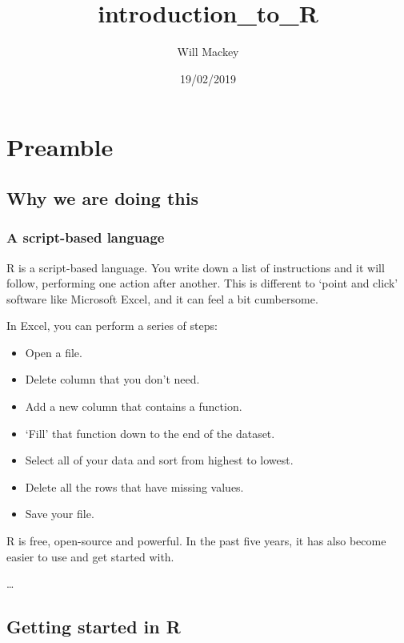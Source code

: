 \documentclass[]{tufte-handout}
\title{introduction\_to\_R}
\author{Will Mackey}
\date{19/02/2019}
\providecommand{\tightlist}{%
  \setlength{\itemsep}{0pt}\setlength{\parskip}{0pt}}
\begin{document}
\maketitle




\hypertarget{preamble}{%
\section{Preamble}\label{preamble}}

\hypertarget{why-we-are-doing-this}{%
\subsection{Why we are doing this}\label{why-we-are-doing-this}}

\hypertarget{a-script-based-language}{%
\subsubsection{A script-based language}\label{a-script-based-language}}

R is a script-based language. You write down a list of instructions and
it will follow, performing one action after another. This is different
to `point and click' software like Microsoft Excel, and it can feel a
bit cumbersome.

In Excel, you can perform a series of steps:

\begin{itemize}
\tightlist
\item
  Open a file.
\item
  Delete column that you don't need.
\item
  Add a new column that contains a function.
\item
  `Fill' that function down to the end of the dataset.
\item
  Select all of your data and sort from highest to lowest.
\item
  Delete all the rows that have missing values.
\item
  Save your file.
\end{itemize}

R is free, open-source and powerful. In the past five years, it has also
become easier to use and get started with.

\ldots{}

\hypertarget{getting-started-in-r}{%
\subsection{Getting started in R}\label{getting-started-in-r}}
\end{document}
